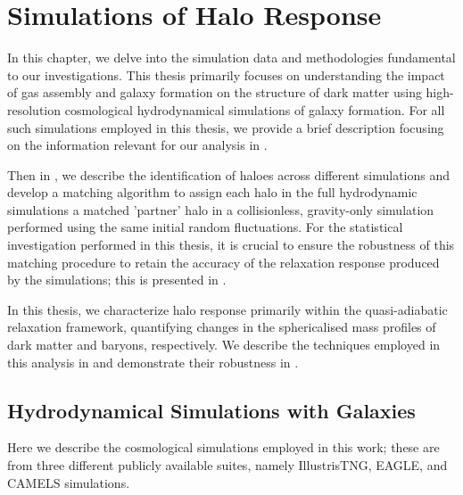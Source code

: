 \chapter{Simulations of Halo Response}
\label{chap:sims-hals}

In this chapter, we delve into the simulation data and methodologies fundamental to our investigations. This thesis primarily focuses on understanding the impact of gas assembly and galaxy formation on the structure of dark matter using high-resolution cosmological hydrodynamical simulations of galaxy formation. For all such simulations employed in this thesis, we provide a brief description focusing on the information relevant for our analysis in .

Then in , we describe the identification of haloes across different simulations and develop a matching algorithm to assign each halo in the full hydrodynamic simulations a matched 'partner' halo in a collisionless, gravity-only simulation performed using the same initial random fluctuations. For the statistical investigation performed in this thesis, it is crucial to ensure the robustness of this matching procedure to retain the accuracy of the relaxation response produced by the simulations; this is presented in .

In this thesis, we characterize halo response primarily within the quasi-adiabatic relaxation framework, quantifying changes in the sphericalised mass profiles of dark matter and baryons, respectively. We describe the techniques employed in this analysis in  and demonstrate their robustness in .

\section{Hydrodynamical Simulations with Galaxies}
\label{sec:sims}
Here we describe the cosmological simulations employed in this work; these are from three different publicly available suites, namely IllustrisTNG, EAGLE, and CAMELS simulations.

